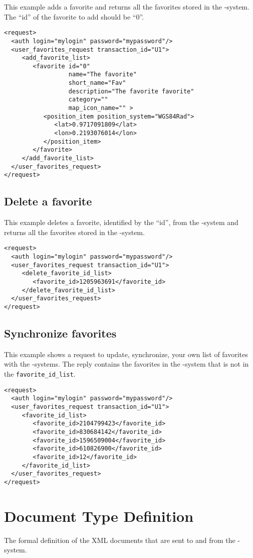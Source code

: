 This example adds a favorite and returns all the favorites stored in the 
\mc-system. The ``id'' of the favorite to add should be ``0''.

\begin{verbatim}
<request>
  <auth login="mylogin" password="mypassword"/>
  <user_favorites_request transaction_id="U1">
     <add_favorite_list>
        <favorite id="0" 
                  name="The favorite"
                  short_name="Fav"
                  description="The favorite favorite"
                  category=""
                  map_icon_name="" >
           <position_item position_system="WGS84Rad">
              <lat>0.9717091809</lat>
              <lon>0.2193076014</lon>
           </position_item>
        </favorite>
     </add_favorite_list>
  </user_favorites_request>
</request>
\end{verbatim}

\subsection{Delete a favorite}

This example deletes a favorite, identified by the ``id'', from the
\mc-system and returns all the favorites stored in the 
\mc-system.

\begin{verbatim}
<request>
  <auth login="mylogin" password="mypassword"/>
  <user_favorites_request transaction_id="U1">
     <delete_favorite_id_list>
        <favorite_id>1205963691</favorite_id> 
     </delete_favorite_id_list>
  </user_favorites_request>
</request>
\end{verbatim}


\subsection{Synchronize favorites}

This example shows a request to update, synchronize, your own list of 
favorites with the \mc-system{s}. The reply contains the favorites in
the \mc-system that is not in the \texttt{favorite\_id\_list}.


\begin{verbatim}
<request>
  <auth login="mylogin" password="mypassword"/>
  <user_favorites_request transaction_id="U1">
     <favorite_id_list>
        <favorite_id>2104799423</favorite_id>
        <favorite_id>830684142</favorite_id>
        <favorite_id>1596509004</favorite_id>
        <favorite_id>610826900</favorite_id>
        <favorite_id>12</favorite_id>
     </favorite_id_list>
  </user_favorites_request>
</request>
\end{verbatim}


\clearemptydoublepage
\section{Document Type Definition}
\label{DTD}
The formal definition of the XML documents that are sent to and from
the \mc-system.

